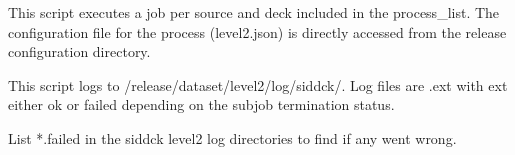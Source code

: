 \documentclass[letterpaper,10pt,english]{sphinxmanual}
\begin{document}
This script executes a job per source and deck included in the process\_list.
The configuration file for the process (level2.json) is directly accessed from
the release configuration directory.

This script logs to /release/dataset/level2/log/sid\sphinxhyphen{}dck/. Log files
are \sphinxhyphen{}\sphinxhyphen{}.ext with ext either ok or failed depending on the
subjob termination status.

List  *.failed in the sid\sphinxhyphen{}dck level2 log directories to find if any went wrong.



\renewcommand{\indexname}{Index}
\printindex
\end{document}
